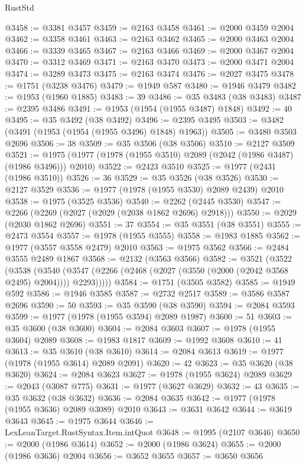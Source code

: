 \begin{lexlean}{RustStd}
\begin{coremodule}
@3458 := @3381 @3457
@3459 := @2163 @3458
@3461 := @2000 @3459 @2004
@3462 := @3358 @3461
@3463 := @2163 @3462
@3465 := @2000 @3463 @2004
@3466 := @3339 @3465
@3467 := @2163 @3466
@3469 := @2000 @3467 @2004
@3470 := @3312 @3469
@3471 := @2163 @3470
@3473 := @2000 @3471 @2004
@3474 := @3289 @3473
@3475 := @2163 @3474
@3476 := @2027 @3475
@3478 := @1751 (@3238 @3476)
@3479 := @1949 @587
@3480 := @1946 @3479
@3482 := @1953 (@1960 @1885)
@3483 := 39
@3486 := @35 @3483 (@38 @3483)
@3487 := @2395 @3486
@3491 := @1953 (@1954 (@1955 @3487) @1848)
@3492 := 40
@3495 := @35 @3492 (@38 @3492)
@3496 := @2395 @3495
@3503 := @3482 (@3491 (@1953 (@1954 (@1955 @3496) @1848) @1963))
@3505 := @3480 @3503 @2696
@3506 := 38
@3509 := @35 @3506 (@38 @3506)
@3510 := @2127 @3509
@3521 := @1975 (@1977 (@1978 (@1955 @3510) @2089 (@2042 (@1986 @3487) (@1986 @3496))) @2010)
@3522 := @2423 @3510
@3525 := @1977 (@2431 (@1986 @3510))
@3526 := 36
@3529 := @35 @3526 (@38 @3526)
@3530 := @2127 @3529
@3536 := @1977 (@1978 (@1955 @3530) @2089 @2439) @2010
@3538 := @1975 (@3525 @3536)
@3540 := @2262 (@2445 @3530)
@3547 := @2266 (@2269 (@2027 (@2029 (@2038 @1862 @2696) @2918)))
@3550 := @2029 (@2030 @1862 @2696)
@3551 := 37
@3554 := @35 @3551 (@38 @3551)
@3555 := @2473 @3554
@3557 := @1978 (@1955 @3555)
@3558 := @1983 @1885
@3562 := @1977 (@3557 @3558 @2479) @2010
@3563 := @1975 @3562
@3566 := @2484 @3555 @2489 @1867
@3568 := @2132 (@3563 @3566)
@3582 := @3521
    (@3522
      (@3538
        (@3540 (@3547 (@2266 (@2468 (@2027 (@3550 (@2000 (@2042 @3568 @2495) @2004)))) @2293)))))
@3584 := @1751 (@3505 @3582)
@3585 := @1949 @592
@3586 := @1946 @3585
@3587 := @2732 @2517
@3589 := @3586 @3587 @2696
@3590 := 50
@3593 := @35 @3590 (@38 @3590)
@3594 := @2084 @3593
@3599 := @1977 (@1978 (@1955 @3594) @2089 @1987)
@3600 := 51
@3603 := @35 @3600 (@38 @3600)
@3604 := @2084 @3603
@3607 := @1978 (@1955 @3604) @2089
@3608 := @1983 @1817
@3609 := @1992 @3608
@3610 := 41
@3613 := @35 @3610 (@38 @3610)
@3614 := @2084 @3613
@3619 := @1977 (@1978 (@1955 @3614) @2089 @2091)
@3620 := 42
@3623 := @35 @3620 (@38 @3620)
@3624 := @2084 @3623
@3627 := @1978 (@1955 @3624) @2089
@3629 := @2043 (@3087 @775)
@3631 := @1977 (@3627 @3629)
@3632 := 43
@3635 := @35 @3632 (@38 @3632)
@3636 := @2084 @3635
@3642 := @1977 (@1978 (@1955 @3636) @2089 @3089) @2010
@3643 := @3631 @3642
@3644 := @3619 @3643
@3645 := @1975 @3644
@3646 := LexLeanTarget.RustSyntax.Item.intQuot
@3648 := @1995 (@2107 @3646)
@3650 := @2000 (@1986 @3614)
@3652 := @2000 (@1986 @3624)
@3655 := @2000 (@1986 @3636) @2004
@3656 := @3652 @3655
@3657 := @3650 @3656

\end{coremodule}
\end{lexlean}
